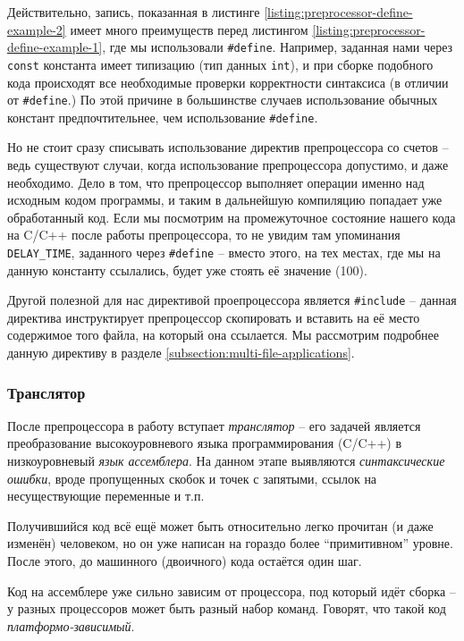 \documentclass[../sparc.tex]{subfiles}
\begin{document}
Действительно, запись, показанная в листинге
\ref{listing:preprocessor-define-example-2} имеет много преимуществ перед
листингом \ref{listing:preprocessor-define-example-1}, где мы использовали
\texttt{#define}.  Например, заданная нами через
\texttt{const} константа имеет типизацию (тип данных
\texttt{int}), и при сборке подобного кода происходят все необходимые
проверки корректности синтаксиса (в отличии от \texttt{#define}.)  По
этой причине в большинстве случаев использование обычных констант
предпочтительнее, чем использование \texttt{#define}.

Но не стоит сразу списывать использование директив препроцессора со счетов --
ведь существуют случаи, когда использование препроцессора допустимо, и даже
необходимо.  Дело в том, что препроцессор выполняет операции именно над исходным
кодом программы, и таким в дальнейшую компиляцию попадает уже обработанный код.
Если мы посмотрим на промежуточное состояние нашего кода на C/C++ после работы
препроцессора, то не увидим там упоминания \texttt{DELAY_TIME},
заданного через \texttt{#define} -- вместо этого, на тех местах, где мы
на данную константу ссылались, будет уже стоять её значение (100).

Другой полезной для нас директивой проепроцессора является
\texttt{#include} -- данная директива инструктирует препроцессор
скопировать и вставить на её место содержимое того файла, на который она
ссылается.  Мы рассмотрим подробнее данную директиву в разделе
\ref{subsection:multi-file-applications}.

\subsubsection{Транслятор}

После препроцессора в работу вступает \emph{транслятор} -- его задачей является
преобразование высокоуровневого языка программирования (C/C++) в низкоуровневый
\emph{язык ассемблера}.  На данном этапе выявляются \emph{синтаксические
ошибки}, вроде пропущенных скобок и точек с запятыми, ссылок на несуществующие
переменные и т.п.

Получившийся код всё ещё может быть относительно легко прочитан (и даже изменён)
человеком, но он уже написан на гораздо более ``примитивном'' уровне.  После
этого, до машинного (двоичного) кода остаётся один шаг.

Код на ассемблере уже сильно зависим от процессора, под который идёт сборка -- у
разных процессоров может быть разный набор команд.  Говорят, что такой код
\emph{платформо-зависимый}.
\end{document}
